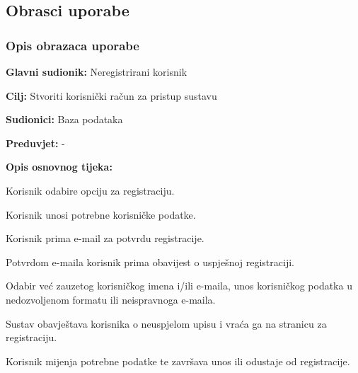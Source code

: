 			\eject 
			
			
				
			\subsection{Obrasci uporabe}

				\subsubsection{Opis obrazaca uporabe}
				
				\noindent {}
				\begin{packed_item}
					
					\item \textbf{Glavni sudionik: }Neregistrirani korisnik
					\item  \textbf{Cilj:} Stvoriti korisnički račun za pristup sustavu
					\item  \textbf{Sudionici:} Baza podataka
					\item  \textbf{Preduvjet:} -
					\item  \textbf{Opis osnovnog tijeka:}
					
					\item Korisnik odabire opciju za registraciju.
					\item Korisnik unosi potrebne korisničke podatke.
					\item Korisnik prima e-mail za potvrdu registracije.
					\item Potvrdom e-maila korisnik prima obavijest o uspješnoj registraciji.
					\item[] \begin{packed_item}
						
						\item[2.a] Odabir već zauzetog korisničkog imena i/ili e-maila, unos korisničkog podatka u nedozvoljenom formatu ili neispravnoga e-maila.
						\item[] \begin{packed_enum}
							
							\item Sustav obavještava korisnika o neuspjelom upisu i vraća ga na stranicu za registraciju.
							\item Korisnik mijenja potrebne podatke te završava unos ili odustaje od registracije.
							
						\end{packed_enum}
						
					\end{packed_item}
				\end{packed_item}
